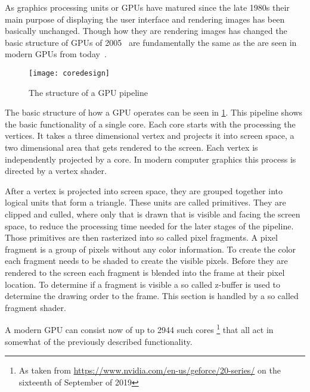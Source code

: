 
As graphics processing units or GPUs have matured since the late 1980s their main purpose of displaying the user interface and rendering images has been basically unchanged. Though how they are rendering images has changed the basic structure of GPUs of 2005~\cite{kilgariff2005geforce} are fundamentally the same as the are seen in modern GPUs from today~\cite{nvidia2018turing}.

\begin{figure}[H]
	\centering
	\texttt{[image: coredesign]}
	\caption{The structure of a GPU pipeline}
	\label{img:gpuPipe}
\end{figure}

The basic structure of how a GPU operates can be seen in \cref{img:gpuPipe}. This pipeline shows the basic functionality of a single core. Each core starts with the processing the vertices. It takes a three dimensional vertex and projects it into screen space, a two dimensional area that gets rendered to the screen. Each vertex is independently projected by a core. In modern computer graphics this process is directed by a vertex shader.

After a vertex is projected into screen space, they are grouped together into logical units that form a triangle. These units are called primitives. They are clipped and culled, where only that is drawn that is visible and facing the screen space, to reduce the processing time needed for the later stages of the pipeline. Those primitives are then rasterized into so called pixel fragments. A pixel fragment is a group of pixels without any color information. To create the color each fragment needs to be shaded to create the visible pixels. Before they are rendered to the screen each fragment is blended into the frame at their pixel location. To determine if a fragment is visible a so called z-buffer is used to determine the drawing order to the frame. This section is handled by a so called fragment shader.

A modern GPU can consist now of up to 2944 such cores \footnote{As taken from \url{https://www.nvidia.com/en-us/geforce/20-series/} on the sixteenth of September of 2019} that all act in somewhat of the previously described functionality.
